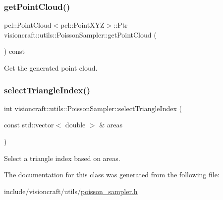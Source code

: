 \subsubsection{\texorpdfstring{get\+Point\+Cloud()}{getPointCloud()}}
{\footnotesize\ttfamily pcl\+::\+Point\+Cloud$<$pcl\+::\+Point\+X\+YZ$>$\+::Ptr visioncraft\+::utils\+::\+Poisson\+Sampler\+::get\+Point\+Cloud (\begin{DoxyParamCaption}{ }\end{DoxyParamCaption}) const}



Get the generated point cloud. 

\mbox{\label{classvisioncraft_1_1utils_1_1PoissonSampler_a4b68225264977cf2df185889c2a105df}} 
\subsubsection{\texorpdfstring{select\+Triangle\+Index()}{selectTriangleIndex()}}
{\footnotesize\ttfamily int visioncraft\+::utils\+::\+Poisson\+Sampler\+::select\+Triangle\+Index (\begin{DoxyParamCaption}\item[{const std\+::vector$<$ double $>$ \&}]{areas }\end{DoxyParamCaption})}



Select a triangle index based on areas. 



The documentation for this class was generated from the following file\+:\begin{DoxyCompactItemize}
\item 
include/visioncraft/utils/\hyperlink{poisson__sampler_8h}{poisson\+\_\+sampler.\+h}\end{DoxyCompactItemize}
